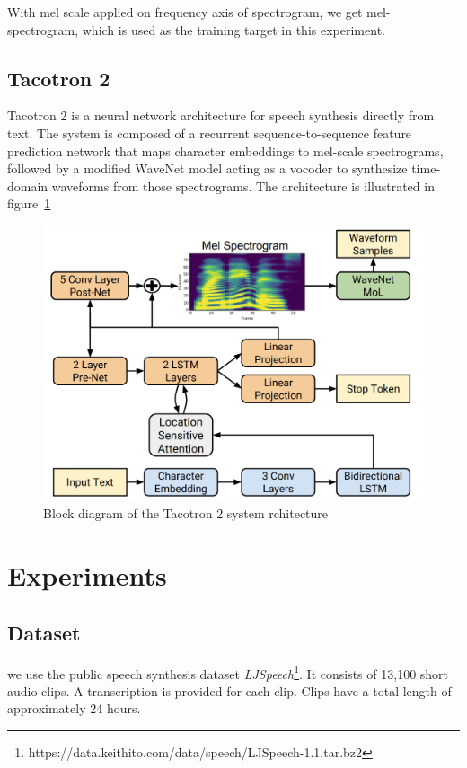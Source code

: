 \documentclass[journal, a4paper]{IEEEtran}
\begin{document}
With mel scale applied on frequency axis of spectrogram, we get mel-spectrogram, which is used as the training target in this experiment.

\subsection{Tacotron 2}

Tacotron 2 is a neural network architecture for speech synthesis directly from text. The system is composed of a recurrent sequence-to-sequence feature prediction network that maps character embeddings to mel-scale spectrograms, followed by a modified WaveNet model acting as a vocoder to synthesize time-domain waveforms from those spectrograms. The architecture is illustrated in figure~\ref{figure:t2-block}

\begin{figure}[htb]
    \includegraphics[width=\linewidth]{figures/t2-block.png}
    \caption{Block diagram of the Tacotron 2 system rchitecture}
    \label{figure:t2-block}
\end{figure}

\section{Experiments}

\subsection{Dataset}

we use the public speech synthesis dataset \emph{LJSpeech}\footnote{https://data.keithito.com/data/speech/LJSpeech-1.1.tar.bz2}. It consists of 13,100 short audio clips. A transcription is provided for each clip. Clips have a total length of approximately 24 hours.
\end{document}
